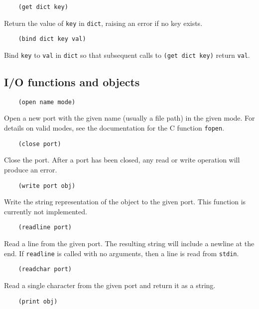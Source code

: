 \documentclass{article}
\newcommand{\inlinecode}{\texttt}
\begin{document}
\begin{verbatim}
    (get dict key)
\end{verbatim}

Return the value of \inlinecode{key} in \inlinecode{dict}, raising an error if no key exists.

\begin{verbatim}
    (bind dict key val)
\end{verbatim}

Bind \inlinecode{key} to \inlinecode{val} in \inlinecode{dict} so that subsequent calls to \inlinecode{(get dict key)} return \inlinecode{val}.

\subsection{I/O functions and objects}
\begin{verbatim}
    (open name mode)
\end{verbatim}

Open a new port with the given name (usually a file path) in the given mode. For details on valid modes, see the documentation for the C function \inlinecode{fopen}.

\begin{verbatim}
    (close port)
\end{verbatim}

Close the port. After a port has been closed, any read or write operation will produce an error.

\begin{verbatim}
    (write port obj)
\end{verbatim}

Write the string representation of the object to the given port. This function is currently not implemented.

\begin{verbatim}
    (readline port)
\end{verbatim}

Read a line from the given port. The resulting string will include a newline at the end. If \inlinecode{readline} is called with no arguments, then a line is read from \inlinecode{stdin}.

\begin{verbatim}
    (readchar port)
\end{verbatim}

Read a single character from the given port and return it as a string.

\begin{verbatim}
    (print obj)
\end{verbatim}
\end{document}
